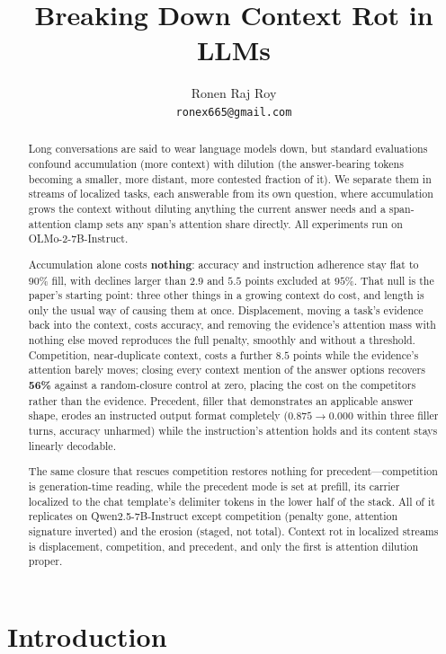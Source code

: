 \documentclass{article}
\title{Breaking Down Context Rot in LLMs}
\author{%
  Ronen Raj Roy\\
  \texttt{ronex665@gmail.com}\\
}
\begin{document}
\maketitle

\begin{abstract}
Long conversations are said to wear language models down, but standard evaluations confound
accumulation (more context) with dilution (the answer-bearing tokens becoming a smaller, more
distant, more contested fraction of it). We separate them in streams of localized tasks,
each answerable from its own question, where accumulation grows the context without diluting
anything the current answer needs and a span-attention clamp sets any span's attention share
directly. All experiments run on OLMo-2-7B-Instruct.

Accumulation alone costs \textbf{nothing}: accuracy and instruction adherence stay flat to
$90\%$ fill, with declines larger than $2.9$ and $5.5$ points excluded at $95\%$. That null is the
paper's starting point: three other things in a growing context do cost, and length is only
the usual way of causing them at once. Displacement, moving a task's
evidence back into the context, costs accuracy, and removing the evidence's attention mass
with nothing else moved reproduces the full penalty, smoothly and without a threshold.
Competition, near-duplicate context, costs a further $8.5$ points while the evidence's
attention barely moves; closing every context mention of the answer options recovers
\textbf{56\%} against a random-closure control at zero, placing the cost on the competitors
rather than the evidence. Precedent, filler that demonstrates an applicable answer
shape, erodes an instructed output format completely ($0.875\to0.000$ within three filler
turns, accuracy unharmed) while the instruction's attention holds and its content stays
linearly decodable.

The same closure that rescues competition restores nothing for precedent---competition is
generation-time reading, while the precedent mode is set at prefill, its carrier localized to
the chat template's delimiter tokens in the lower half of the stack. All of it
replicates on Qwen2.5-7B-Instruct except competition (penalty gone, attention signature
inverted) and the erosion (staged, not total). Context rot in localized streams is
displacement, competition, and precedent, and only the first is attention dilution proper.
\end{abstract}

\section{Introduction}
\label{sec:intro}
\end{document}
